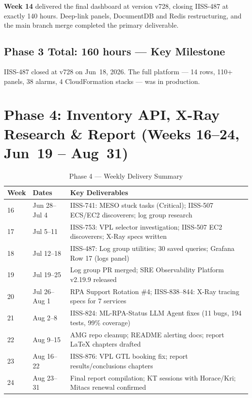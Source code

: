 \textbf{Week 14} delivered the final dashboard at version v728, closing
IISS-487 at exactly 140 hours. Deep-link panels, DocumentDB and Redis
restructuring, and the main branch merge completed the primary deliverable.

\subsection{Phase 3 Total: 160 hours --- Key Milestone}

IISS-487 closed at v728 on Jun~18, 2026. The full platform --- 14 rows,
110+ panels, 38 alarms, 4 CloudFormation stacks --- was in production.

\section{Phase 4: Inventory API, X-Ray Research \& Report (Weeks 16--24, Jun~19 -- Aug~31)}
\label{sec:wb_phase4}

\begin{table}[ht]
\centering
\caption{Phase 4 --- Weekly Delivery Summary}
\label{tab:wb_phase4}
\begin{tabular}{p{1.2cm}p{4.0cm}p{7.5cm}}
\toprule
\textbf{Week} & \textbf{Dates} & \textbf{Key Deliverables} \\
\midrule
16 & Jun 28--Jul 4 & IISS-741: MESO stuck tasks (Critical); IISS-507 ECS/EC2 discoverers; log group research \\
17 & Jul 5--11 & IISS-753: VPL selector investigation; IISS-507 EC2 discoverers; X-Ray specs written \\
18 & Jul 12--18 & IISS-487: Log group utilities; 30 saved queries; Grafana Row 17 (logs panel) \\
19 & Jul 19--25 & Log group PR merged; SRE Observability Platform v2.19.9 released \\
20 & Jul 26--Aug 1 & RPA Support Rotation \#4; IISS-838--844: X-Ray tracing specs for 7 services \\
21 & Aug 2--8 & IISS-824: ML-RPA-Status LLM Agent fixes (11 bugs, 194 tests, 99\% coverage) \\
22 & Aug 9--15 & AMG repo cleanup; README alerting docs; report LaTeX chapters drafted \\
23 & Aug 16--22 & IISS-876: VPL GTL booking fix; report results/conclusions chapters \\
24 & Aug 23--31 & Final report compilation; KT sessions with Horace/Kri; Mitacs renewal confirmed \\
\bottomrule
\end{tabular}
\end{table}

